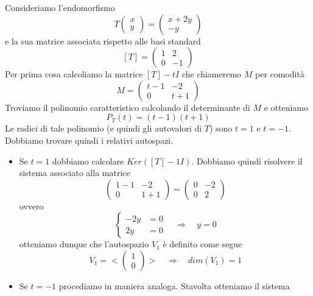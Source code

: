 \begin{example}
	Consideriamo l'endomorfismo
	\[
		T \begin{pmatrix} x \\ y \end{pmatrix} =
		\begin{pmatrix}
			x + 2y \\
			-y
		\end{pmatrix}
	\]
	e la sua matrice associata rispetto alle basi standard
	\[
		[T] = \begin{pmatrix}
			1 & 2  \\
			0 & -1
		\end{pmatrix}
	\]
	Per prima cosa calcoliamo la matrice $[T] - tI$ che chiameremo $M$ per comodit\`a
	\[
		M = \begin{pmatrix}
			t - 1 & -2    \\
			0     & t + 1
		\end{pmatrix}
	\]
	Troviamo il polinomio caratteristico calcolando il determinante di $M$ e otteniamo
	\[
		P_T(t) = (t - 1)(t + 1)
	\]
	Le radici di tale polinomio (e quindi gli autovalori di $T$) sono $t = 1$ e $t = -1$.
	Dobbiamo trovare quindi i relativi autospazi.
	\begin{itemize}
		\item Se $t = 1$ dobbiamo calcolare $Ker([T] - 1I)$. Dobbiamo quindi risolvere il
		      sistema associato alla matrice
		      \[
			      \begin{pmatrix}
				      1 - 1 & -2    \\ 
				      0     & 1 + 1
			      \end{pmatrix} = 
			      \begin{pmatrix}
				      0 & -2 \\ 
				      0 & 2
			      \end{pmatrix}
		      \]
		      ovvero
		      \[
			      \begin{cases}
				      -2y & = 0 \\
				      2y  & = 0
			      \end{cases} \quad \Rightarrow \quad
			      y = 0
		      \]
		      otteniamo dunque che l'autospazio $V_1$ \`e definito come segue 
		      \[
			      V_1 = < \begin{pmatrix} 1 \\ 0 \end{pmatrix} > \quad \Rightarrow \quad
			      dim(V_1) = 1
		      \]
		\item Se $t = -1$ procediamo in maniera analoga. Stavolta otteniamo il sistema

\end{itemize}
\end{example}
